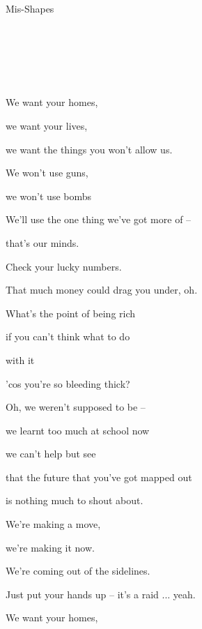 \begin{song}{Mis-Shapes}{


	\mbox{ \AMaj \EMaj \Fshm \DMaj \DSeven}


	\mbox{ \GMaj \GMajSeven \GSeven \CMaj \CMajSeven \CSeven }
	

	\mbox{ \Em \EmSix \EmaddC }

}
\begin{SongVerse}
		We want your homes,

		we want your lives,

		we want the things you won't allow us. 

		We won't use guns, 

		we won't use bombs

		We'll use the one thing we've got more of --

		that's our minds.  \hspace{20pt}  \qquad {}

	\end{SongVerse}

	\begin{SongVerse}

		 Check your lucky numbers.

		That much money could drag you under, oh. 

		What's the point of being rich 

		if you can't think what to do 
		
		with it 

		'cos you're so bleeding thick?

	\end{SongVerse}

	\begin{SongVerse}

		
		 \quad Oh, we weren't supposed to be -- 

		we learnt too much at school now 

		 we can't help but see 

		that the future that you've got mapped out 

		is  nothing much to shout about. 

	\end{SongVerse}

	\begin{SongVerse}

		
		 \quad We're making a move, 

		we're making it now. 

		We're coming out of the sidelines. 

		\quad Just put your hands up -- it's a raid ... yeah.

		We want your homes,


\end{SongVerse}
\end{song}
